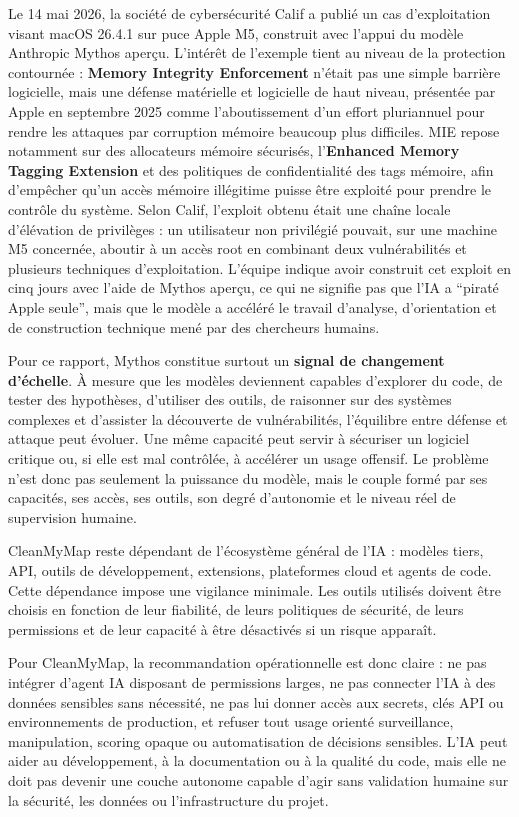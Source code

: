 \documentclass[
  10pt,
  a4paper,
  DIV=11,
  numbers=noendperiod,
  oneside]{scrreprt}
\let\oldtextbf\textbf
\renewcommand{\textbf}[1]{\oldtextbf{\textcolor{cmmnavy}{#1}}}
\begin{document}
Le 14 mai 2026, la société de cybersécurité Calif a publié un cas
d'exploitation visant macOS 26.4.1 sur puce Apple M5, construit avec
l'appui du modèle Anthropic Mythos aperçu. L'intérêt de l'exemple tient
au niveau de la protection contournée : \textbf{Memory Integrity
Enforcement} n'était pas une simple barrière logicielle, mais une
défense matérielle et logicielle de haut niveau, présentée par Apple en
septembre 2025 comme l'aboutissement d'un effort pluriannuel pour rendre
les attaques par corruption mémoire beaucoup plus difficiles. MIE repose
notamment sur des allocateurs mémoire sécurisés, l'\textbf{Enhanced
Memory Tagging Extension} et des politiques de confidentialité des tags
mémoire, afin d'empêcher qu'un accès mémoire illégitime puisse être
exploité pour prendre le contrôle du système. Selon Calif, l'exploit
obtenu était une chaîne locale d'élévation de privilèges : un
utilisateur non privilégié pouvait, sur une machine M5 concernée,
aboutir à un accès root en combinant deux vulnérabilités et plusieurs
techniques d'exploitation. L'équipe indique avoir construit cet exploit
en cinq jours avec l'aide de Mythos aperçu, ce qui ne signifie pas que
l'IA a ``piraté Apple seule'', mais que le modèle a accéléré le travail
d'analyse, d'orientation et de construction technique mené par des
chercheurs humains.

Pour ce rapport, Mythos constitue surtout un \textbf{signal de
changement d'échelle}. À mesure que les modèles deviennent capables
d'explorer du code, de tester des hypothèses, d'utiliser des outils, de
raisonner sur des systèmes complexes et d'assister la découverte de
vulnérabilités, l'équilibre entre défense et attaque peut évoluer. Une
même capacité peut servir à sécuriser un logiciel critique ou, si elle
est mal contrôlée, à accélérer un usage offensif. Le problème n'est donc
pas seulement la puissance du modèle, mais le couple formé par ses
capacités, ses accès, ses outils, son degré d'autonomie et le niveau
réel de supervision humaine.

CleanMyMap reste dépendant de l'écosystème général de l'IA : modèles
tiers, API, outils de développement, extensions, plateformes cloud et
agents de code. Cette dépendance impose une vigilance minimale. Les
outils utilisés doivent être choisis en fonction de leur fiabilité, de
leurs politiques de sécurité, de leurs permissions et de leur capacité à
être désactivés si un risque apparaît.

Pour CleanMyMap, la recommandation opérationnelle est donc claire : ne
pas intégrer d'agent IA disposant de permissions larges, ne pas
connecter l'IA à des données sensibles sans nécessité, ne pas lui donner
accès aux secrets, clés API ou environnements de production, et refuser
tout usage orienté surveillance, manipulation, scoring opaque ou
automatisation de décisions sensibles. L'IA peut aider au développement,
à la documentation ou à la qualité du code, mais elle ne doit pas
devenir une couche autonome capable d'agir sans validation humaine sur
la sécurité, les données ou l'infrastructure du projet.
\end{document}
